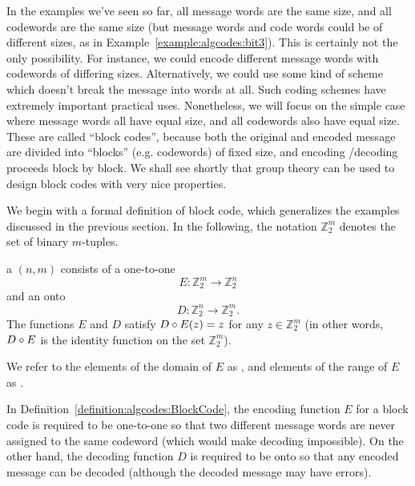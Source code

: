 In the examples we've seen so far,  all message words are the same size, and all codewords are the same size (but message words and code words could be of different sizes, as in Example~\ref{example:algcodes:bit3}). This is certainly not the only possibility. For instance, we could encode different message words with codewords of differing sizes. Alternatively, we could use some kind of scheme which doesn't break the message into words at all. Such coding schemes have extremely important practical uses. Nonetheless, we will focus on the simple case where message words all have equal size, and all codewords also have equal size. These are called  ``block codes'', because both the original and encoded message are divided into ``blocks'' (e.g. codewords) of fixed size, and encoding /decoding proceeds block by block.  We shall see shortly that group
theory  can be used to design block codes with very nice properties. 

We begin with a formal definition of block code, which generalizes the examples discussed in the previous section. In the following, the notation $\mathbb{Z}^{m}_{2}$ denotes the set of  binary $m$-tuples.

\begin{defn}\label{definition:algcodes:BlockCode}
a $(n, m)$    consists of a one-to-one  
\[
E:\mathbb{Z}^{m}_{2} \rightarrow \mathbb{Z}^{n}_{2}
\]
and an onto  
\[
D:\mathbb{Z}^{n}_{2} \rightarrow \mathbb{Z}^{m}_{2}.
\]
The functions $E$ and $D$ satisfy $D \circ E (z)= z$ for any $z \in \mathbb{Z}_2^m$ (in other words, $D \circ E$ is the identity function on the set $\mathbb{Z}_2^m$).

We refer to the elements of the domain of $E$ as , and elements of the range of $E$ as . 
\end{defn}

\begin{rem}
In Definition~\ref{definition:algcodes:BlockCode}, the encoding function $E$ for a block code is required to be one-to-one so that two different message words are never assigned to the same codeword (which would make decoding impossible). On the other hand, the decoding function $D$  is required to be onto so that any encoded message can be decoded (although the decoded message may have errors).
\end{rem}

